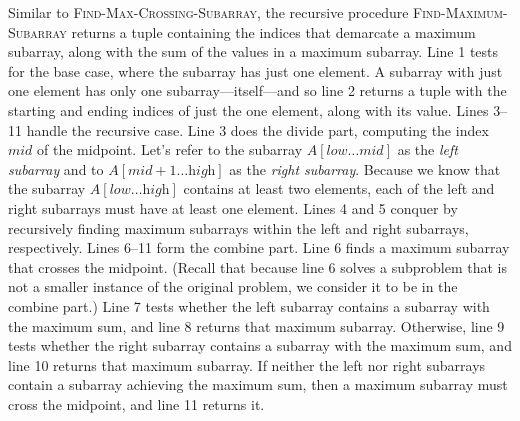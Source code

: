 \documentclass{report}
\begin{document}
        Similar to \textsc{Find-Max-Crossing-Subarray}, the recursive procedure \textsc{Find-Maximum-Subarray} returns a tuple containing the indices that demarcate a maximum subarray, along with the sum of the values in a maximum subarray. Line 1 tests for the base case, where the subarray has just one element. A subarray with just one element has only one subarray---itself---and so line 2 returns a tuple with the starting and ending indices of just the one element, along with its value. Lines 3--11 handle the recursive case. Line 3 does the divide part, computing the index \( \textit{mid} \) of the midpoint. Let’s refer to the subarray \( A[\textit{low} \ldots \textit{mid}] \) as the \textit{left subarray} and to \( A[\textit{mid} + 1 \ldots \textit{high}] \) as the \textit{right subarray}. Because we know that the subarray \( A[\textit{low} \ldots \textit{high}] \) contains at least two elements, each of the left and right subarrays must have at least one element. Lines 4 and 5 conquer by recursively finding maximum subarrays within the left and right subarrays, respectively. Lines 6--11 form the combine part. Line 6 finds a maximum subarray that crosses the midpoint. (Recall that because line 6 solves a subproblem that is not a smaller instance of the original problem, we consider it to be in the combine part.) Line 7 tests whether the left subarray contains a subarray with the maximum sum, and line 8 returns that maximum subarray. Otherwise, line 9 tests whether the right subarray contains a subarray with the maximum sum, and line 10 returns that maximum subarray. If neither the left nor right subarrays contain a subarray achieving the maximum sum, then a maximum subarray must cross the midpoint, and line 11 returns it.
        \bigbreak \noindent 
\end{document}
